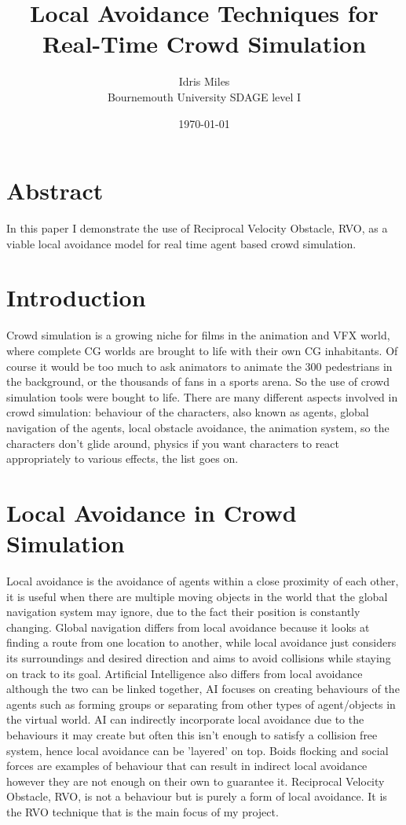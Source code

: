 \documentclass[a4paper,twocolumn]{article}
\author{Idris Miles\\
Bournemouth University SDAGE level I}
\title{Local Avoidance Techniques for Real-Time Crowd Simulation}
\date{\today}
\begin{document}
\maketitle

\section*{Abstract}
In this paper I demonstrate the use of Reciprocal Velocity Obstacle, RVO, as a viable local avoidance model for real time agent based crowd simulation. \\

\section{Introduction}
Crowd simulation is a growing niche for films in the animation and VFX world, where complete CG worlds are brought to life with their own CG inhabitants. Of course it would be too much to ask animators to animate the 300 pedestrians in the background, or the thousands of fans in a sports arena. So the use of crowd simulation tools were bought to life. There are many different aspects involved in crowd simulation: behaviour of the characters, also known as agents, global navigation of the agents, local obstacle avoidance, the animation system, so the characters don't glide around, physics if you want characters to react appropriately to various effects, the list goes on.

\section{Local Avoidance in Crowd Simulation}
Local avoidance is the avoidance of agents within a close proximity of each other, it is useful when there are multiple moving objects in the world that the global navigation system may ignore, due to the fact their position is constantly changing. Global navigation differs from local avoidance because it looks at finding a route from one location to another, while local avoidance just considers its surroundings and desired direction and aims to avoid collisions while staying on track to its goal. Artificial Intelligence also differs from local avoidance although the two can be linked together, AI focuses on creating behaviours of the agents such as forming groups or separating from other types of agent/objects in the virtual world. AI can indirectly incorporate local avoidance due to the behaviours it may create but often this isn't enough to satisfy a collision free system, hence local avoidance can be 'layered' on top. Boids flocking and social forces are examples of behaviour that can result in indirect local avoidance however they are not enough on their own to guarantee it. Reciprocal Velocity Obstacle, RVO, is not a behaviour but is purely a form of local avoidance. It is the RVO technique that is the main focus of my project.\\
\end{document}
